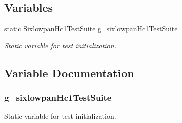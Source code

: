 \subsection*{Variables}
\begin{DoxyCompactItemize}
\item 
static \hyperlink{classSixlowpanHc1TestSuite}{Sixlowpan\+Hc1\+Test\+Suite} \hyperlink{sixlowpan-hc1-test_8cc_a8b60bb4d94641e434ec360f308da6ecb}{g\+\_\+sixlowpan\+Hc1\+Test\+Suite}
\begin{DoxyCompactList}\small\item\em Static variable for test initialization. \end{DoxyCompactList}\end{DoxyCompactItemize}


\subsection{Variable Documentation}
\subsubsection[{\texorpdfstring{g\+\_\+sixlowpan\+Hc1\+Test\+Suite}{g_sixlowpanHc1TestSuite}}]{ g\+\_\+sixlowpan\+Hc1\+Test\+Suite\hspace{0.3cm}{\ttfamily [static]}}\hypertarget{sixlowpan-hc1-test_8cc_a8b60bb4d94641e434ec360f308da6ecb}{}\label{sixlowpan-hc1-test_8cc_a8b60bb4d94641e434ec360f308da6ecb}


Static variable for test initialization. 

